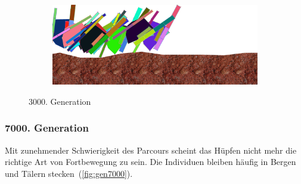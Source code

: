 \begin{figure}[H]
\begin{subfigure}[b]{0.45\textwidth}
                \includegraphics[width=\linewidth,center]{graphics/simulation-results/4_gen3000_4}
                \caption{\label{fig:gen3000_4}}
              \end{subfigure}
              \caption{3000. Generation \label{fig:gen3000}}
            \end{figure}

          \subsubsection{7000. Generation}
            Mit zunehmender Schwierigkeit des Parcours scheint das Hüpfen nicht mehr die richtige Art von Fortbewegung zu sein.
            Die Individuen bleiben häufig in Bergen und Tälern stecken~(\vref{fig:gen7000}).

            \vspace{0.5cm}

